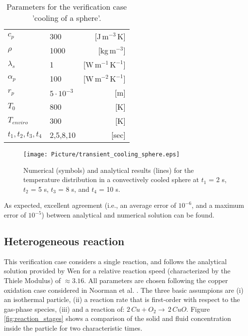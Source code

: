 \documentclass{particles2015}
\begin{document}
\begin{table}[h]
  \centering 
  \caption{Parameters for the verification case 'cooling of a sphere'.}
   \begin{tabular}{llr}
      \hline 
        $c_p$                   &300       & [J$\,\text{m}^{-3}\,$K]\\   
       	$\rho$					&1000	   & [kg$\, \text{m}^{-3}$]\\
        $\lambda_s$				&1		   & [W$\, \text{m}^{-1} \,\text{K}^{-1}$]\\
        $\alpha_p$ 				&100	   & [W$\, \text{m}^{-2} \,\text{K}^{-1}$]\\
        $r_p$					&$5\cdot 10^{-3}$ & [m]\\
        $ T_0$					& 800& [K] \\
        $T_{enviro}$			& 300& [K]\\
        $t_1,t_2,t_3,t_4$ 		& 2,5,8,10 & [sec]\\
      \hline      
       \end{tabular}
   \setlength{\belowcaptionskip}{12pt}
   \label{tab:properties_cooling_sphere}
\end{table}


\begin{figure}[h!]
   \centering
   \texttt{[image: Picture/transient\_cooling\_sphere.eps]}
   \caption{Numerical (symbols) and analytical results (lines) for the temperature distribution in a convectively cooled sphere at $t_1$ = 2 s, $t_2$ = 5 s, $t_3$ = 8 s, and $t_4$ = 10 s.}
   \label{fig:Cooling_sphere}
\end{figure}

As expected, excellent agreement (i.e., an average error of $10^{-6}$, and a maximum error of $10^{-5}$) between analytical and numerical solution can be found.


\subsection{Heterogeneous reaction}
\label{sec:heterogeneuous_reaction}

This verification case considers a single reaction, and follows the analytical solution provided by Wen \cite{Wen} for a relative reaction speed (characterized by the Thiele Modulus) of $\approx 3.16$. All parameters are chosen following the copper oxidation case considered in Noorman et al. \cite{Noorman2011}. The three basic assumpions are (i) an isothermal particle, (ii) a reaction rate that is first-order with respect to the gas-phase species, (iii) and a reaction of: $2 \, Cu + O_2 \rightarrow \, 2\, CuO$. Figure \ref{fig:reaction_stages} shows a comparison of the solid and fluid concentration inside the particle for two characteristic times.
\end{document}
